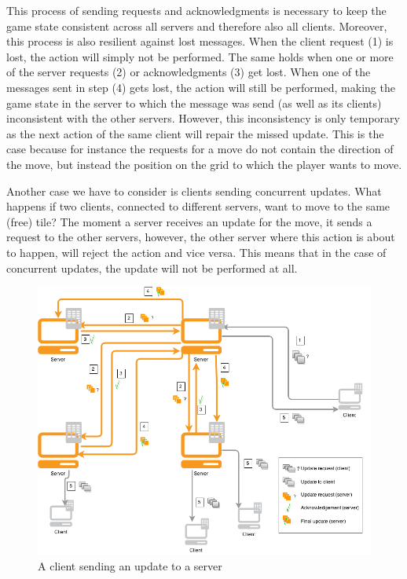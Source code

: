 This process of sending requests and acknowledgments is necessary to keep the game state consistent across all servers and therefore also all clients. 
Moreover, this process is also resilient against lost messages. 
When the client request (1) is lost, the action will simply not be performed. 
The same holds when one or more of the server requests (2) or acknowledgments (3) get lost. 
When one of the messages sent in step (4) gets lost, the action will still be performed, making the game state in the server to which the message was send (as well as its clients) inconsistent with the other servers. 
However, this inconsistency is only temporary as the next action of the same client will repair the missed update. 
This is the case because for instance the requests for a move do not contain the direction of the move, but instead the position on the grid to which the player wants to move.

Another case we have to consider is clients sending concurrent updates. 
What happens if two clients, connected to different servers, want to move to the same (free) tile? 
The moment a server receives an update for the move, it sends a request to the other servers, however, the other server where this action is about to happen, will reject the action and vice versa. 
This means that in the case of concurrent updates, the update will not be performed at all.

\begin{figure}[h!]
  \centering
    \includegraphics[width=\textwidth]{diagrams/game-update}
    
  \caption{A client sending an update to a server}
  \label{fig:update_diagram}
\end{figure}

